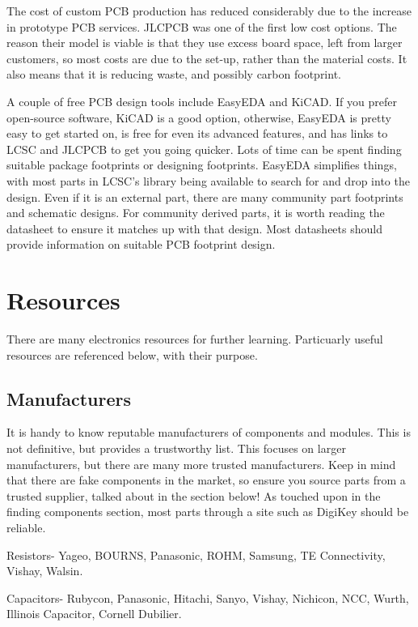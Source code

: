 \documentclass[a4paper,11pt]{report}
\begin{document}
The cost of custom PCB production has reduced considerably due to the increase in prototype PCB services. JLCPCB was one of the first low cost options. The reason their model is viable is that they use excess board space, left from larger customers, so most costs are due to the set-up, rather than the material costs. It also means that it is reducing waste, and possibly carbon footprint.

A couple of free PCB design tools include EasyEDA and KiCAD. If you prefer open-source software, KiCAD is a good option, otherwise, EasyEDA is pretty easy to get started on, is free for even its advanced features, and has links to LCSC and JLCPCB to get you going quicker. Lots of time can be spent finding suitable package footprints or designing footprints. EasyEDA simplifies things, with most parts in LCSC's library being available to search for and drop into the design. Even if it is an external part, there are many community part footprints and schematic designs. For community derived parts, it is worth reading the datasheet to ensure it matches up with that design. Most datasheets should provide information on suitable PCB footprint design.

\section{Resources}

There are many electronics resources for further learning. Particuarly useful resources are referenced below, with their purpose.

\subsection{Manufacturers}

It is handy to know reputable manufacturers of components and modules. This is not definitive, but provides a trustworthy list. This focuses on larger manufacturers, but there are many more trusted manufacturers. Keep in mind that there are fake components in the market, so ensure you source parts from a trusted supplier, talked about in the section below! As touched upon in the finding components section, most parts through a site such as DigiKey should be reliable.

Resistors- Yageo, BOURNS, Panasonic, ROHM, Samsung, TE Connectivity, Vishay, Walsin.

Capacitors- Rubycon, Panasonic, Hitachi, Sanyo, Vishay, Nichicon, NCC, Wurth, Illinois Capacitor, Cornell Dubilier.
\end{document}
